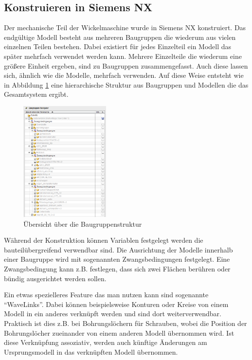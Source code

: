 \documentclass[paper=A4,pagesize,DIV=18, 12pt,listof=totoc,bibliography=totoc,headings=optiontohead,open=any]{article}
\begin{document}
\subsection{Konstruieren in Siemens NX}
Der mechanische Teil der Wickelmaschine wurde in Siemens NX konstruiert. Das endgültige Modell besteht aus mehreren Baugruppen die wiederum aus vielen einzelnen Teilen bestehen. Dabei existiert für jedes Einzelteil ein Modell das später mehrfach verwendet werden kann.  Mehrere Einzelteile die wiederum eine größere Einheit ergeben, sind zu Baugruppen zusammengefasst. Auch diese lassen sich, ähnlich wie die Modelle, mehrfach verwenden. Auf diese Weise entsteht wie in Abbildung \ref{fig:baugruppenstruktur} eine hierarchische Struktur aus Baugruppen und Modellen die das Gesamtsystem ergibt. 
\begin{figure}[H]
	\centering
	\includegraphics[width=0.4\textwidth]{NX_Screenshots/baugruppen.png}
	\caption{Übersicht über die Baugruppenstruktur} 
	\label{fig:baugruppenstruktur}
\end{figure}


Während der Konstruktion können Variablen festgelegt werden die bauteilübergreifend verwendbar sind. Die Ausrichtung der Modelle innerhalb einer Baugruppe wird mit sogenannten Zwangsbedingungen festgelegt. Eine Zwangsbedingung kann z.B. festlegen, dass sich zwei Flächen berühren oder bündig ausgerichtet werden sollen. 

Ein etwas spezielleres Feature das man nutzen kann sind sogenannte \enquote{WaveLinks}. Dabei können beispielsweise Konturen oder Kreise von einem Modell in ein anderes verknüpft werden und sind dort weiterverwendbar. Praktisch ist dies z.B. bei Bohrungslöchern für Schrauben, wobei die Position der Bohrungslöcher zueinander von einem anderen Modell übernommen wird. Ist diese Verknüpfung assoziativ, werden auch künftige Änderungen am Ursprungsmodell in das verknüpften Modell übernommen.
    
\end{document}
